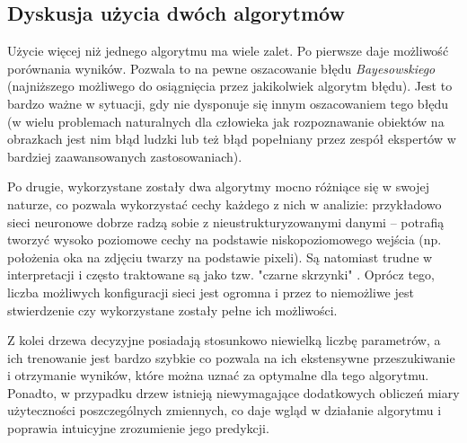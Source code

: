 \FloatBarrier
\subsection{Dyskusja użycia dwóch algorytmów}
Użycie więcej niż jednego algorytmu ma wiele zalet. 
Po pierwsze daje możliwość porównania wyników. Pozwala to na pewne oszacowanie błędu \textit{Bayesowskiego} (najniższego możliwego do osiągnięcia przez jakikolwiek algorytm błędu). Jest to bardzo ważne w sytuacji, gdy nie dysponuje się innym oszacowaniem tego błędu (w wielu problemach naturalnych dla człowieka jak rozpoznawanie obiektów na obrazkach jest nim błąd ludzki lub też błąd popełniany przez zespół ekspertów w bardziej zaawansowanych zastosowaniach).

Po drugie, wykorzystane zostały dwa algorytmy mocno różniące się w swojej naturze, co pozwala wykorzystać cechy każdego z nich w analizie: przykładowo sieci neuronowe dobrze radzą sobie z nieustrukturyzowanymi danymi -- potrafią tworzyć wysoko poziomowe cechy na podstawie niskopoziomowego wejścia (np. położenia oka na zdjęciu twarzy na podstawie pixeli). Są natomiast trudne w interpretacji i często traktowane są jako tzw. "czarne skrzynki" . Oprócz tego, liczba możliwych konfiguracji sieci jest ogromna i przez to niemożliwe jest stwierdzenie czy wykorzystane zostały pełne ich możliwości.

Z kolei drzewa decyzyjne posiadają stosunkowo niewielką liczbę parametrów, a ich trenowanie jest bardzo szybkie co pozwala na ich ekstensywne przeszukiwanie i otrzymanie wyników, które można uznać za optymalne dla tego algorytmu.
Ponadto, w przypadku drzew istnieją niewymagające dodatkowych obliczeń miary użyteczności poszczególnych zmiennych, co daje wgląd w działanie algorytmu i poprawia intuicyjne zrozumienie jego predykcji.






